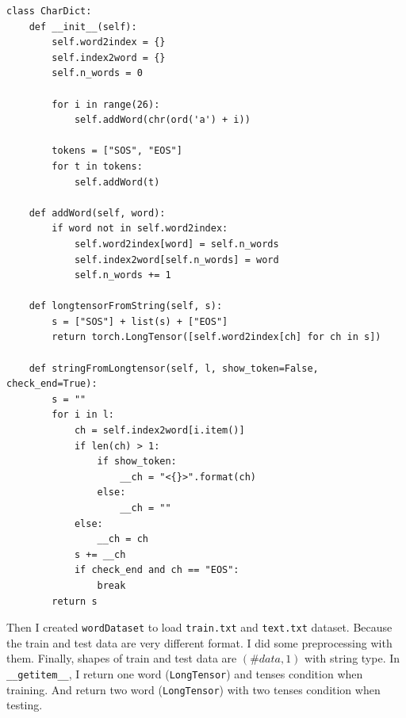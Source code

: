 \documentclass[12pt]{article}
\begin{document}
\begin{verbatim}
class CharDict:
    def __init__(self):
        self.word2index = {}
        self.index2word = {}
        self.n_words = 0
        
        for i in range(26):
            self.addWord(chr(ord('a') + i))
        
        tokens = ["SOS", "EOS"]
        for t in tokens:
            self.addWord(t)

    def addWord(self, word):
        if word not in self.word2index:
            self.word2index[word] = self.n_words
            self.index2word[self.n_words] = word
            self.n_words += 1

    def longtensorFromString(self, s):
        s = ["SOS"] + list(s) + ["EOS"]
        return torch.LongTensor([self.word2index[ch] for ch in s])
    
    def stringFromLongtensor(self, l, show_token=False, check_end=True):
        s = ""
        for i in l:
            ch = self.index2word[i.item()]
            if len(ch) > 1:
                if show_token:
                    __ch = "<{}>".format(ch)
                else:
                    __ch = ""
            else:
                __ch = ch
            s += __ch
            if check_end and ch == "EOS":
                break
        return s
\end{verbatim}

Then I created \verb|wordDataset| to load \verb|train.txt| and \verb|text.txt| dataset. Because the train and test data are very different format. I did some preprocessing with them. Finally, shapes of train and test data are $(\#data, 1)$ with string type. In \verb|__getitem__|, I return one word (\verb|LongTensor|) and tenses condition when training. And return two word (\verb|LongTensor|) with two tenses condition when testing.
\end{document}

